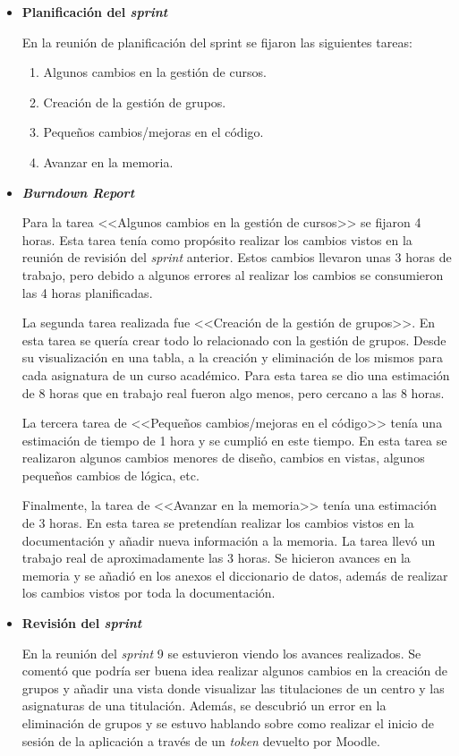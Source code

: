 \begin{itemize}
\item\textbf{Planificación del \textit{sprint}}


En la reunión de planificación del sprint se fijaron las siguientes tareas:
\begin{enumerate}
		\item Algunos cambios en la gestión de cursos.
		\item Creación de la gestión de grupos.
		\item Pequeños cambios/mejoras en el código.
		\item Avanzar en la memoria.
\end{enumerate}

\item\textbf{\textit{Burndown Report}}

Para la tarea <<Algunos cambios en la gestión de cursos>> se fijaron 4 horas. 
Esta tarea tenía como propósito realizar los cambios vistos en la reunión de revisión del \textit{sprint} anterior.
Estos cambios llevaron unas 3 horas de trabajo, pero debido a algunos errores al realizar los cambios se consumieron las 4 horas planificadas.

La segunda tarea realizada fue <<Creación de la gestión de grupos>>.
En esta tarea se quería crear todo lo relacionado con la gestión de grupos.
Desde su visualización en una tabla, a la creación y eliminación de los mismos para cada asignatura de un curso académico.
Para esta tarea se dio una estimación de 8 horas que en trabajo real fueron algo menos, pero cercano a las 8 horas.

La tercera tarea de <<Pequeños cambios/mejoras en el código>> tenía una estimación de tiempo de 1 hora y se cumplió en este tiempo.
En esta tarea se realizaron algunos cambios menores de diseño, cambios en vistas, algunos pequeños cambios de lógica, etc.

Finalmente, la tarea de <<Avanzar en la memoria>> tenía una estimación de 3 horas.
En esta tarea se pretendían realizar los cambios vistos en la documentación y añadir nueva información a la memoria.
La tarea llevó un trabajo real de aproximadamente las 3 horas. Se hicieron avances en la memoria y se añadió en los anexos el diccionario de datos, además de realizar los cambios vistos por toda la documentación.

\item\textbf{Revisión del \textit{sprint}}

En la reunión del \textit{sprint} 9 se estuvieron viendo los avances realizados. Se comentó que podría ser buena idea realizar algunos cambios en la creación de grupos y añadir una vista donde visualizar las titulaciones de un centro y las asignaturas de una titulación. Además, se descubrió un error en la eliminación de grupos y se estuvo hablando sobre como realizar el inicio de sesión de la aplicación a través de un \textit{token} devuelto por Moodle.
\end{itemize}

